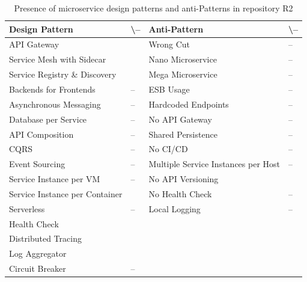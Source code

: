 \documentclass{Configuration_Files/PoliMi3i_thesis}
\newcommand{\cmark}{\ding{51}}%
\begin{document}
\begin{table}[H]
\centering 
    \begin{tabular}{ 
  | >{\centering\arraybackslash} m{16em} 
  | >{\centering\arraybackslash} m{2.2em} 
  | >{\centering\arraybackslash} m{16em} 
  | >{\centering\arraybackslash} m{2.2em} | }
    \hline
    \rowcolor{bluepoli!40}
    \textbf{Design Pattern} & \cmark \textbackslash – & \textbf{Anti-Pattern} & \cmark \textbackslash – \T\B \\
    \hline \hline
    API Gateway & \cmark & Wrong Cut & – \T\B\\
    \hline
    \rowcolor{bluepoli!10}
    Service Mesh with Sidecar & \cmark & Nano Microservice & – \T\B \\
    \hline
    Service Registry \& Discovery & \cmark & Mega Microservice & – \T\B \\
    \hline
    \rowcolor{bluepoli!10}
    Backends for Frontends & – & ESB Usage & – \T\B \\
    \hline
    Asynchronous Messaging & – & Hardcoded Endpoints & – \T\B \\
    \hline
    \rowcolor{bluepoli!10}
    Database per Service & – & No API Gateway & – \T\B \\
    \hline
    API Composition & – & Shared Persistence & – \T\B \\
    \hline
    \rowcolor{bluepoli!10}
    CQRS & – & No CI/CD & – \T\B \\
    \hline
    Event Sourcing & – & Multiple Service Instances per Host & – \T\B \\
    \hline
    \rowcolor{bluepoli!10}
    Service Instance per VM & – & No API Versioning & \cmark \T\B \\
    \hline
    Service Instance per Container & \cmark & No Health Check & – \T\B \\
    \hline
    \rowcolor{bluepoli!10}
    Serverless & – & Local Logging & – \T\B \\
    \hline
    Health Check & \cmark &  & \T\B \\
    \hline
    \rowcolor{bluepoli!10}
    Distributed Tracing & \cmark & & \T\B \\
    \hline
    Log Aggregator & \cmark &  & \T\B \\
    \hline
    \rowcolor{bluepoli!10}
    Circuit Breaker & – &  & \T\B \\
    \hline
    \end{tabular}
    \\[10pt]
    \caption{Presence of microservice design patterns and anti-Patterns in repository R2}
    \label{table:R2_result}
\end{table}
\end{document}
